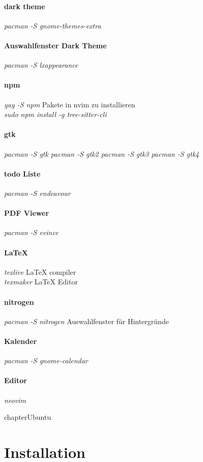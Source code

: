 \documentclass[10pt,a4paper,twoside]{book}
\begin{document}
\paragraph{dark theme}
\textit{pacman -S gnome-themes-extra}
\paragraph{Auswahlfenster Dark Theme}
\textit{pacman -S lxappearance}
\paragraph{npm}
\textit{yay -S npm} Pakete in nvim zu installieren\\
\textit{sudo npm install -g tree-sitter-cli}
\paragraph{gtk}
\textit{pacman -S gtk}
\textit{pacman -S gtk2}
\textit{pacman -S gtk3}
\textit{pacman -S gtk4}
\paragraph{todo Liste}
\textit{pacman -S endeavour}
\paragraph{PDF Viewer}
\textit{pacman -S evince}
\paragraph{LaTeX}
\textit{texlive} LaTeX compiler\\ 
\textit{texmaker} LaTeX Editor\\ 
\paragraph{nitrogen}
\textit{pacman -S nitrogen} Auswahlfenster für Hintergründe\\ 
\paragraph{Kalender}
\textit{pacman -S gnome-calendar}
\paragraph{Editor}
\textit{neovim}

chapter{Ubuntu}
\section{Installation}
\end{document}
